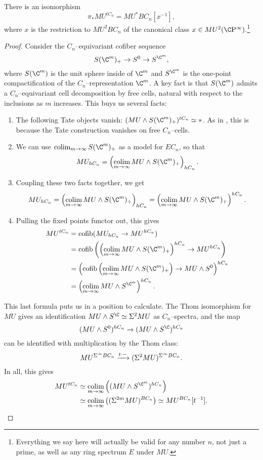 \begin{theorem}\label{TateConstructionOnMU}
There is an isomorphism \[\pi_* MU^{tC_n} = MU^* BC_n[x^{-1}],\] where \(x\) is the restriction to \(MU^2 BC_n\) of the canonical class \(x \in MU^2(\CP^\infty)\).\footnote{Everything we say here will actually be valid for any number \(n\), not just a prime, as well as any ring spectrum \(E\) under \(MU\).}
\end{theorem}
\begin{proof}
Consider the \(C_n\)--equivariant cofiber sequence \[S(\C^m)_+ \to S^0 \to S^{\C^m},\] where \(S(\C^m)\) is the unit sphere inside of \(\C^m\) and \(S^{\C^m}\) is the one-point compactification of the \(C_n\)--representation \(\C^m\).  A key fact is that \(S(\C^m)\) admits a \(C_n\)--equivariant cell decomposition by free cells, natural with respect to the inclusions as \(m\) increases.  This buys us several facts:
\begin{enumerate}
    \item The following Tate objects vanish: \((MU \sm S(\C^m)_+)^{tC_n} \simeq *\).  As in , this is because the Tate construction vanishes on free \(C_n\)--cells.
    \item We can use \(\colim_{m \to \infty} S(\C^m)_+\) as a model for \(EC_n\), so that \[MU_{hC_n} = \left( \colim_{m \to \infty} MU \sm S(\C^m)_+ \right)_{hC_n}.\]
    \item Coupling these two facts together, we get \[MU_{hC_n} = \left( \colim_{m \to \infty} MU \sm S(\C^m)_+ \right)_{hC_n} = \left( \colim_{m \to \infty} MU \sm S(\C^m)_+ \right)^{hC_n}.\]
    \item Pulling the fixed points functor out, this gives
    \begin{align*}
    MU^{tC_n} & = \cofib(MU_{hC_n} \to MU^{hC_n}) \\
    & = \cofib\left(\left( \colim_{m \to \infty} MU \sm S(\C^m)_+ \right)^{hC_n} \to MU^{hC_n}\right) \\
    & = \left(\cofib\left( \colim_{m \to \infty} MU \sm S(\C^m)_+ \right) \to MU \sm S^0\right)^{hC_n} \\
    & = \left( \colim_{m \to \infty} MU \sm S^{\C^m} \right)^{hC_n}.
    \end{align*}
\end{enumerate}
This last formula puts us in a position to calculate.  The Thom isomorphism for \(MU\) gives an identification \(MU \sm S^{\C} \simeq \Susp^2 MU\) as \(C_n\)--spectra, and the map \[(MU \sm S^0)^{hC_n} \to (MU \sm S^{\C})^{hC_n}\] can be identified with multiplication by the Thom class: \[MU^{\Sigma^\infty BC_n} \xrightarrow{t \cdot -} (\Sigma^2 MU)^{\Sigma^\infty BC_n}.\]  In all, this gives
\begin{align*}
MU^{tC_n} & \simeq \colim_{m \to \infty} \left((MU \sm S^{\C^m})^{hC_n}\right) \\
& \simeq \colim_{m \to \infty} \left((\Susp^{2m} MU)^{BC_n}\right) \simeq MU^{BC_n}[t^{-1}]. \qedhere
\end{align*}
\end{proof}

